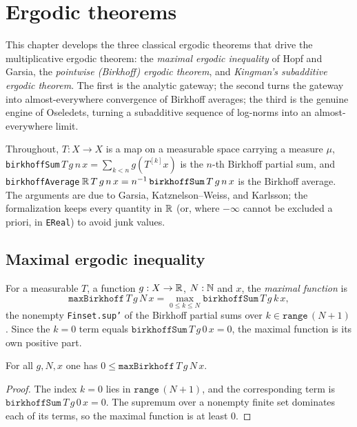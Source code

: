 \chapter{Ergodic theorems}
\label{chap:ergodic}

This chapter develops the three classical ergodic theorems that drive the
multiplicative ergodic theorem: the \emph{maximal ergodic inequality} of
Hopf and Garsia, the \emph{pointwise (Birkhoff) ergodic theorem}, and
\emph{Kingman's subadditive ergodic theorem}. The first is the analytic
gateway; the second turns the gateway into almost-everywhere convergence of
Birkhoff averages; the third is the genuine engine of Oseledets, turning a
subadditive sequence of log-norms into an almost-everywhere limit.

Throughout, \(T : X \to X\) is a map on a measurable space carrying a measure
\(\mu\), \texttt{birkhoffSum}\,\(T\,g\,n\,x = \sum_{k<n} g(T^{[k]}x)\) is the
\(n\)-th Birkhoff partial sum, and \texttt{birkhoffAverage}\,\(\mathbb{R}\,T\,g\,n\,x =
n^{-1}\,\texttt{birkhoffSum}\,T\,g\,n\,x\) is the Birkhoff average. The
arguments are due to Garsia, Katznelson--Weiss, and Karlsson; the formalization
keeps every quantity in \(\mathbb{R}\) (or, where \(-\infty\) cannot be excluded a
priori, in \texttt{EReal}) to avoid junk values.

\section{Maximal ergodic inequality}

\begin{definition}\label{maxBirkhoff}
  \leanok
  For a measurable \(T\), a function \(g : X \to \mathbb{R}\), \(N : \mathbb{N}\) and \(x\),
  the \emph{maximal function} is
  \[
    \texttt{maxBirkhoff}\,T\,g\,N\,x
      = \max_{0 \le k \le N} \texttt{birkhoffSum}\,T\,g\,k\,x,
  \]
  the nonempty \texttt{Finset.sup'} of the Birkhoff partial sums over
  \(k \in \texttt{range}\,(N+1)\). Since the \(k = 0\) term equals
  \(\texttt{birkhoffSum}\,T\,g\,0\,x = 0\), the maximal function is its own
  positive part.
\end{definition}

\begin{lemma}\label{maxBirkhoff_nonneg}
  \leanok
  For all \(g, N, x\) one has \(0 \le \texttt{maxBirkhoff}\,T\,g\,N\,x\).
\end{lemma}
\begin{proof}\leanok
  The index \(k = 0\) lies in \(\texttt{range}\,(N+1)\), and the corresponding
  term is \(\texttt{birkhoffSum}\,T\,g\,0\,x = 0\). The supremum over a
  nonempty finite set dominates each of its terms, so the maximal function is
  at least \(0\).
\end{proof}

